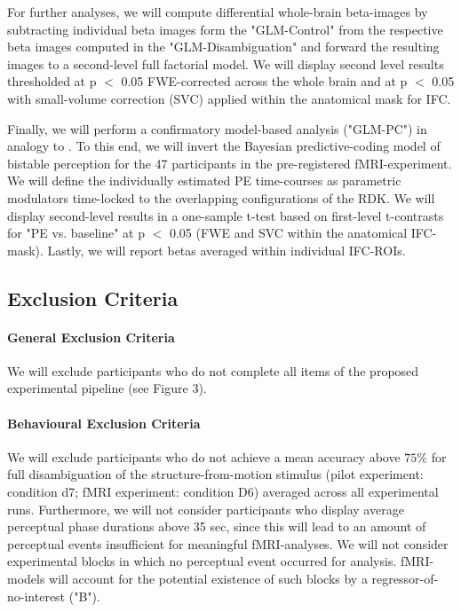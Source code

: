 \documentclass[12pt]{article}
\begin{document}
For further analyses, we will compute differential whole-brain beta-images by subtracting individual beta images form the "GLM-Control" from the respective beta images computed in the "GLM-Disambiguation" and forward the resulting images to a second-level full factorial model. We will display second level results thresholded at p $<$ 0.05 FWE-corrected across the whole brain and at p $<$ 0.05 with small-volume correction (SVC) applied within the anatomical mask for IFC.

Finally, we will perform a confirmatory model-based analysis ("GLM-PC") in analogy to \cite{Weilnhammer2017}. To this end, we will invert the Bayesian predictive-coding model of bistable perception for the 47 participants in the pre-registered fMRI-experiment. We will define the individually estimated PE time-courses as parametric modulators time-locked to the overlapping configurations of the RDK. We will display second-level results in a one-sample t-test based on first-level t-contrasts for "PE vs. baseline" at p $<$ 0.05 (FWE and SVC within the anatomical IFC-mask). Lastly, we will report betas averaged within individual IFC-ROIs.

\subsection{Exclusion Criteria}

\paragraph{General Exclusion Criteria}

We will exclude participants who do not complete all items of the proposed experimental pipeline (see Figure 3).  

\paragraph{Behavioural Exclusion Criteria}

We will exclude participants who do not achieve a mean accuracy above $75\%$ for full disambiguation of the structure-from-motion stimulus (pilot experiment: condition d7; fMRI experiment: condition D6) averaged across all experimental runs. Furthermore, we will not consider participants who display average perceptual phase durations above 35 sec, since this will lead to an amount of perceptual events insufficient for meaningful fMRI-analyses. We will not consider experimental blocks in which no perceptual event occurred for analysis. fMRI-models will account for the potential existence of such blocks by a regressor-of-no-interest ("B").    
\end{document}
